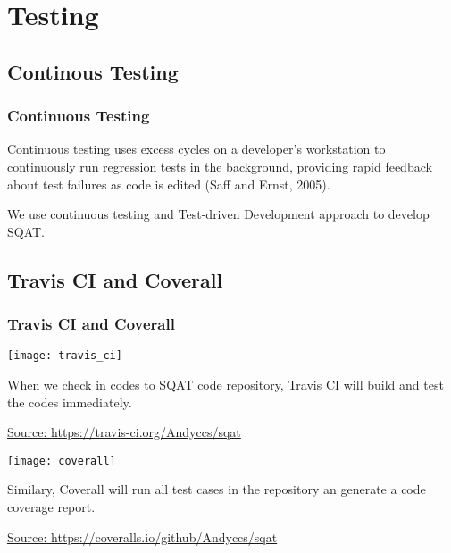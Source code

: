 \section{Testing}

\subsection{Continous Testing}
\begin{frame}
\frametitle{Continuous Testing}

\begin{definition}
Continuous testing uses excess cycles on a developer’s workstation to continuously run regression tests in the background, providing rapid feedback about test failures as code is edited (Saff and Ernst, 2005).
\end{definition}

We use continuous testing and Test-driven Development approach to develop SQAT.

\end{frame}

\subsection{Travis CI and Coverall}
\begin{frame}[allowframebreaks]
\frametitle{Travis CI and Coverall}

\begin{center}
\texttt{[image: travis\_ci]}
\end{center}

When we check in codes to SQAT code repository, Travis CI will build and test the codes immediately.

\tiny{\url{Source: https://travis-ci.org/Andyccs/sqat}}

\framebreak

\begin{center}
\texttt{[image: coverall]}
\end{center}

\normalsize
Similary, Coverall will run all test cases in the repository an generate a code coverage report. 

\tiny{\url{Source: https://coveralls.io/github/Andyccs/sqat}}

\end{frame}